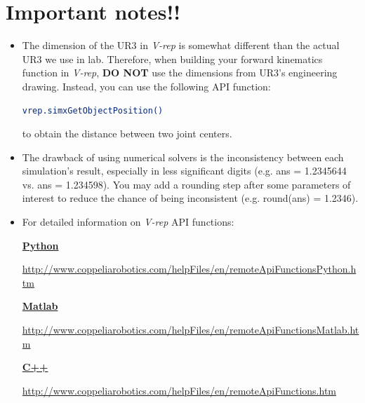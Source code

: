 \section{Important notes!!}
\begin{itemize}
\item The dimension of the UR3 in \textit{V-rep} is somewhat different than the actual UR3 we use in lab. Therefore, when building your forward kinematics function in \textit{V-rep}, \textbf{DO NOT} use the dimensions from UR3's engineering drawing. Instead, you can use the following API function:
\begin{lstlisting}[language=bash]
vrep.simxGetObjectPosition()
\end{lstlisting}
to obtain the distance between two joint centers.

\item The drawback of using numerical solvers is the inconsistency between each simulation's result, especially in less significant digits (e.g. ans = 1.2345644 vs. ans = 1.234598). You may add a rounding step after some parameters of interest to reduce the chance of being inconsistent (e.g. round(ans) = 1.2346).

\item For detailed information on \textit{V-rep} API functions:

\underline{\textbf{Python}}

\url{http://www.coppeliarobotics.com/helpFiles/en/remoteApiFunctionsPython.htm}

\underline{\textbf{Matlab}}

\url{http://www.coppeliarobotics.com/helpFiles/en/remoteApiFunctionsMatlab.htm}

\underline{\textbf{C++}}

\url{http://www.coppeliarobotics.com/helpFiles/en/remoteApiFunctions.htm}

\end{itemize}